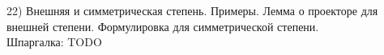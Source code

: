 22) Внешняя и симметрическая степень. Примеры. Лемма о проекторе для внешней степени. Формулировка для симметрической степени.\\

Шпаргалка: TODO\\
